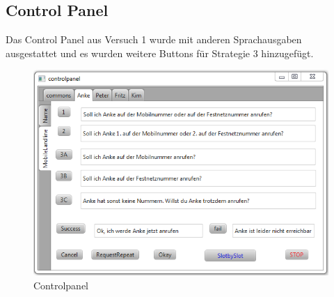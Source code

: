 \documentclass[12pt,a4paper]{scrartcl}
\begin{document}
\subsection{Control Panel}
Das Control Panel aus Versuch 1 wurde mit anderen Sprachausgaben ausgestattet und es wurden weitere Buttons für Strategie 3 hinzugefügt. 
\begin{figure}[htbp]
\includegraphics{controlpanel.png}
\caption{Controlpanel}
\label{cp1}
\end{figure}
\end{document}
